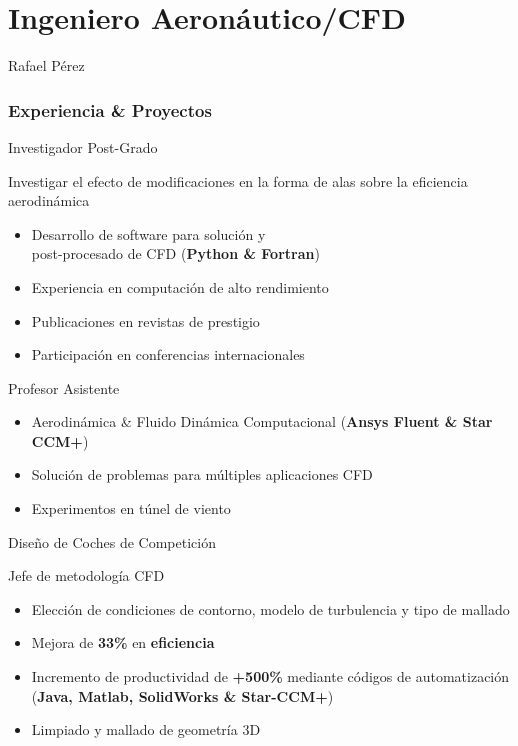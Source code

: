 \documentclass[fontsize=10pt]{tccv_esp}
\begin{document}
\part{Ingeniero Aeron\'autico/CFD}{Rafael P\'erez}

\section{Experiencia \& Proyectos}
\begin{eventlist}
     {Investigador Post-Grado}

Investigar el efecto de modificaciones en la forma de alas sobre la eficiencia aerodin\'amica
\begin{itemize}
	\itemsep -2pt
	\item Desarrollo de software para soluci\'on y \\post-procesado de CFD (\textbf{Python \& Fortran})
	\item Experiencia en computaci\'on de alto rendimiento
	\item Publicaciones en revistas de prestigio
	\item Participaci\'on en conferencias internacionales
\end{itemize}

	{Profesor Asistente}
\begin{itemize}
	\itemsep -2pt
	\item Aerodin\'amica \& Fluido Din\'amica Computacional (\textbf{Ansys Fluent \& Star
	CCM+})
	\item Soluci\'on de problemas para m\'ultiples aplicaciones CFD 
	\item Experimentos en t\'unel de viento
\end{itemize}


     {Dise\~{n}o de Coches de Competici\'on}

Jefe de metodolog\'ia CFD 
     \begin{itemize}
	\itemsep -2pt
	\item Elecci\'on de condiciones de contorno, modelo de turbulencia y tipo de mallado
     	\item Mejora de \textbf{33\%} en \textbf{eficiencia}
     	\item Incremento de productividad de \textbf{+500\%} mediante c\'odigos de automatizaci\'on (\textbf{Java, Matlab, SolidWorks \& Star-CCM+})
	\item Limpiado y mallado de geometr\'ia 3D
     \end{itemize}


\end{eventlist}
\end{document}
